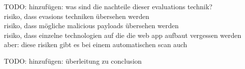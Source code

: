 {\color{red} TODO: hinzufügen: was sind die nachteile dieser evaluations technik? \\
risiko, dass evasions techniken übersehen werden \\
risiko, dass mögliche malicious payloads übersehen werden \\
risiko, dass einzelne technologien auf die die web app aufbaut vergessen werden \\
aber: diese risiken gibt es bei einem automatischen scan auch \\
}

{\color{red} TODO: hinzufügen: überleitung zu conclusion }
